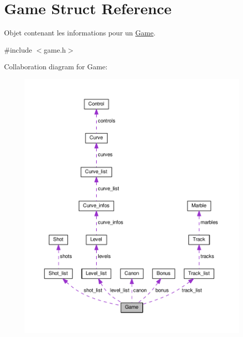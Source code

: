 \hypertarget{struct_game}{}\section{Game Struct Reference}
\label{struct_game}


Objet contenant les informations pour un \hyperlink{struct_game}{Game}.  




{\ttfamily \#include $<$game.\+h$>$}



Collaboration diagram for Game\+:
\nopagebreak
\begin{figure}[H]
\begin{center}
\leavevmode
\includegraphics[width=350pt]{struct_game__coll__graph}
\end{center}
\end{figure}
